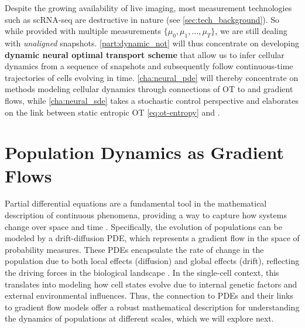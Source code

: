 Despite the growing availability of live imaging, most measurement technologies such as \acrshort{sc}\acrshort{RNA-seq} are destructive in nature (see \cref{sec:tech_background}).
So while provided with multiple measurements $\{ \mu_0, \mu_1, \dots, \mu_T \}$, we are still dealing with \emph{unaligned} snapshots.
\cref{part:dynamic_not} will thus concentrate on developing \textbf{dynamic neural optimal transport scheme} that allow us to infer cellular dynamics from a sequence of snapshots and subsequently follow continuous-time trajectories of cells evolving in time.
\cref{cha:neural_pde} will thereby concentrate on methods modeling cellular dynamics through connections of \acrlong{OT} to  and gradient flows, while \cref{cha:neural_sde} takes a stochastic control perspective and elaborates on the link between static entropic OT \eqref{eq:ot-entropy} and .


\section{Population Dynamics as Gradient Flows}

Partial differential equations are a fundamental tool in the mathematical description of continuous phenomena, providing a way to capture how systems change over space and time \citep{risken1996fokker}. 
Specifically, the evolution of populations can be modeled by a drift-diffusion PDE, which represents a gradient flow in the space of probability measures.
These PDEs encapsulate the rate of change in the population due to both local effects (diffusion) and global effects (drift), reflecting the driving forces in the biological landscape \citep{teschendorff2021statistical, weinreb2018fundamental}.
In the single-cell context, this translates into modeling how cell states evolve due to internal genetic factors and external environmental influences. Thus, the connection to PDEs and their links to gradient flow models offer a robust mathematical description for understanding the dynamics of populations at different scales, which we will explore next.

